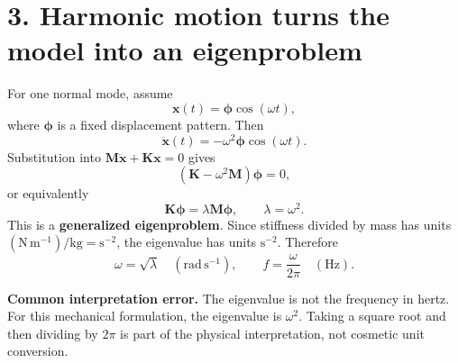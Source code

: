\documentclass[11pt,a4paper]{article}
\begin{document}
\section*{3. Harmonic motion turns the model into an eigenproblem}
For one normal mode, assume
\begin{equation}
 \mathbf{x}(t)=\boldsymbol{\phi}\cos(\omega t),
\end{equation}
where $\boldsymbol{\phi}$ is a fixed displacement pattern. Then
\begin{equation}
 \ddot{\mathbf{x}}(t)=-\omega^2\boldsymbol{\phi}\cos(\omega t).
\end{equation}
Substitution into $\mathbf{M}\ddot{\mathbf{x}}+\mathbf{K}\mathbf{x}=0$ gives
\begin{equation}
 (\mathbf{K}-\omega^2\mathbf{M})\boldsymbol{\phi}=0,
\end{equation}
or equivalently
\begin{equation}
 \boxed{\mathbf{K}\boldsymbol{\phi}=\lambda\mathbf{M}\boldsymbol{\phi}},
 \qquad \lambda=\omega^2.
\end{equation}
This is a \textbf{generalized eigenproblem}. Since stiffness divided by mass has units $(\mathrm{N\,m^{-1}})/\mathrm{kg}=\mathrm{s^{-2}}$, the eigenvalue has units $\mathrm{s^{-2}}$. Therefore
\begin{equation}
 \omega=\sqrt{\lambda}\quad(\mathrm{rad\,s^{-1}}),
 \qquad f=\frac{\omega}{2\pi}\quad(\mathrm{Hz}).
\end{equation}

\begin{aibox}
\textbf{Common interpretation error.} The eigenvalue is not the frequency in hertz. For this mechanical formulation, the eigenvalue is $\omega^2$. Taking a square root and then dividing by $2\pi$ is part of the physical interpretation, not cosmetic unit conversion.
\end{aibox}
\end{document}
